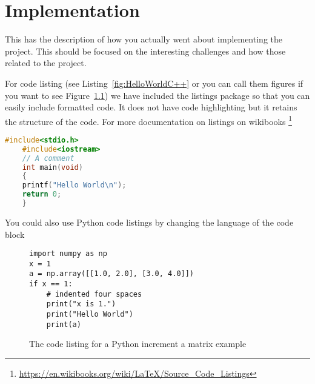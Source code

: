 \chapter{Implementation}
\label{chap:implementation}
This has the description of how you actually went about implementing the project.  This should be focused on the interesting challenges and how those related to the project.



For code listing (see Listing~\ref{fig:HelloWorldC++} or you can call them figures if you want to see Figure~\ref{fig:PythonCode}) we have included the listings package so that you can easily include formatted code.  It does not have code highlighting but it retains the structure of the code.  For more documentation on listings on wikibooks \footnote{\url{https://en.wikibooks.org/wiki/LaTeX/Source_Code_Listings}}




\begin{lstlisting}[language=C++, caption= {Hello World C++ The code listing for Hello World in C++, with colour syntax highlighting.}, label={fig:HelloWorldC++}]
    #include<stdio.h>
    #include<iostream>
    // A comment
    int main(void)
    {
    printf("Hello World\n");
    return 0;
    }
\end{lstlisting}

You could also use Python code listings by changing the language of the code block

\begin{figure}[th] 
  \centering
\lstset{language=Python}
\begin{lstlisting}
import numpy as np
x = 1
a = np.array([[1.0, 2.0], [3.0, 4.0]])
if x == 1:
    # indented four spaces
    print("x is 1.")
    print("Hello World")
    print(a)

\end{lstlisting}
  \caption[Python code example]{The code listing for a Python increment a matrix example}
  \label{fig:PythonCode}
\end{figure}



